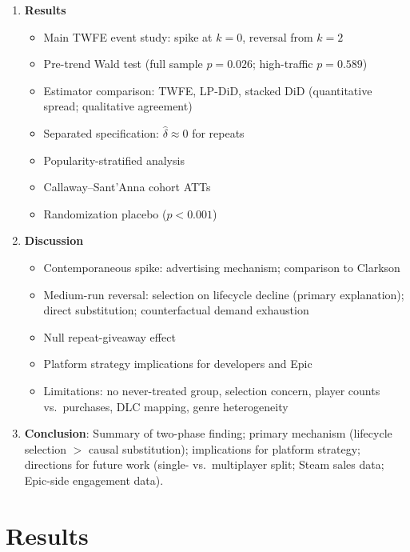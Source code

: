 \documentclass[11pt]{article}
\begin{document}
\begin{enumerate}[leftmargin=2em]
  \item \textbf{Results}
    \begin{itemize}
      \item Main TWFE event study: spike at $k=0$, reversal from $k=2$
      \item Pre-trend Wald test (full sample $p=0.026$; high-traffic $p=0.589$)
      \item Estimator comparison: TWFE, LP-DiD, stacked DiD (quantitative spread;
        qualitative agreement)
      \item Separated specification: $\hat{\delta} \approx 0$ for repeats
      \item Popularity-stratified analysis
      \item Callaway--Sant'Anna cohort ATTs
      \item Randomization placebo ($p < 0.001$)
    \end{itemize}

  \item \textbf{Discussion}
    \begin{itemize}
      \item Contemporaneous spike: advertising mechanism; comparison to Clarkson
      \item Medium-run reversal: selection on lifecycle decline (primary explanation);
        direct substitution; counterfactual demand exhaustion
      \item Null repeat-giveaway effect
      \item Platform strategy implications for developers and Epic
      \item Limitations: no never-treated group, selection concern, player counts
        vs.\ purchases, DLC mapping, genre heterogeneity
    \end{itemize}

  \item \textbf{Conclusion}: Summary of two-phase finding; primary mechanism
    (lifecycle selection $>$ causal substitution); implications for platform strategy;
    directions for future work (single- vs.\ multiplayer split; Steam sales data;
    Epic-side engagement data).
\end{enumerate}

\section{Results}
\end{document}
